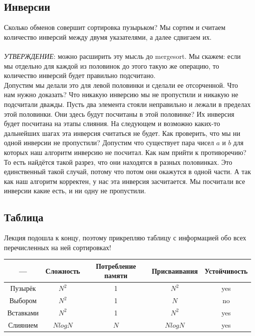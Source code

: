 \documentclass[12pt]{article}
\begin{document}
\subsection*{Инверсии}
Сколько обменов совершит сортировка пузырьком? Мы сортим и считаем количество инверсий между двумя указателями, а далее сдвигаем их.\\ \\
\textit{УТВЕРЖДЕНИЕ}: можно расширить эту мысль до mergesort. Мы скажем: если мы отдельно для каждой из половинок до этого такую же операцию, то количество инверсий будет правильно подсчитано. \\

Допустим мы делали это для левой половинки и сделали ее отсорченной. Что нам нужно доказать? Что никакую инверсию мы не пропустили и никакую не подсчитали дважды. Пусть два элемента стояли неправильно и лежали в пределах этой половинки. Они здесь будут посчитаны в этой половинке? Их инверсия будет посчитана на этапы слияния. На следующем и возможно каких-то дальнейших шагах эта инверсия считаться не будет. Как проверить, что мы ни одной инверсии не пропустили? Допустим что существует пара чисел $a$ и $b$ для которых наш алгоритм инверсию не посчитал. Как нам прийти к противоречию? То есть найдётся такой разрез, что они находятся в разных половинках. Это единственный такой случай, потому что потом они окажутся в одной части. А так как наш алгоритм корректен, у нас эта инверсия засчитается. Мы посчитали все инверсии какие есть, и ни одну не пропустили.
\subsection*{Таблица}
Лекция подошла к концу, поэтому прикрепляю таблицу с информацией обо всех перечисленных на ней сортировках!\\
\renewcommand{\arraystretch}{1.5}
\renewcommand{\tabcolsep}{0.2cm}
\begin{center}
\centering
\begin{tabular}{|c|c|c|c|c|}
\hline
--- & Сложность & Потребление памяти & Присваивания & Устойчивость \\
\hline
Пузырёк & $N^2$ & 1 & $N^2$ & yes \\ 
\hline
Выбором & $N^2$ & 1 & $N$ & no \\
\hline
Вставками & $N^2$ & 1 & $N^2$ & yes \\
\hline
Слиянием & $NlogN$ & $N$ & $NlogN$ & yes \\
\hline
\end{tabular}
\end{center}
\end{document}
